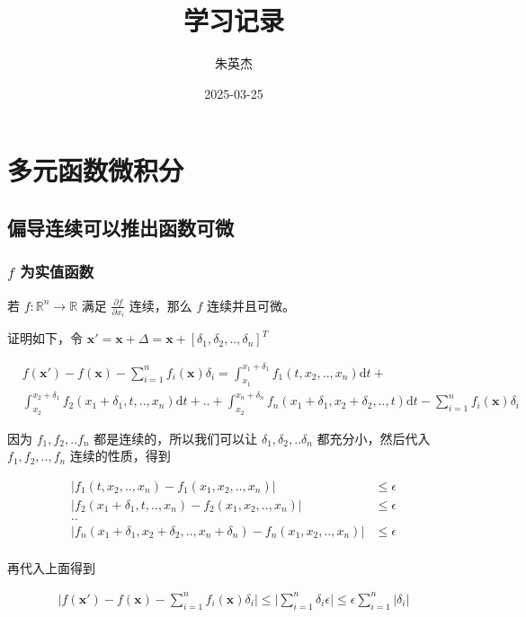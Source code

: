 \documentclass[12pt,a4paper]{ctexart}
\title{学习记录}
\author{朱英杰}
\date{2025-03-25}
\begin{document}
\maketitle
\tableofcontents

\section{多元函数微积分}

\subsection{偏导连续可以推出函数可微}

\subsubsection{$f$ 为实值函数}

若 $f: \mathbb{R}^n \to \mathbb{R}$ 满足 $\frac{\partial f}{\partial x_i}$ 连续，那么 $f$ 连续并且可微。

证明如下，令 $\mathbf{x'} = \mathbf{x} + \Delta = \mathbf{x} + [\delta_1, \delta_2, .., \delta_n]^T$

\begin{align*}
    & f(\mathbf{x}')  - f(\mathbf{x}) - \sum_{i=1}^{n}f_i(\mathbf{x})\delta_i = \int_{x_1}^{x_1 + \delta_1}f_1(t, x_2, .., x_n) \text{d}t  + \\ 
    & \int_{x_2}^{x_2 + \delta_1}f_2(x_1 + \delta_1, t, .., x_n) \text{d}t + .. + \int_{x_2}^{x_n + \delta_n}f_n(x_1 + \delta_1, x_2 + \delta_2, .., t) \text{d}t - \sum_{i=1}^{n}f_i(\mathbf{x}) \delta_i
\end{align*}

因为 $f_1, f_2, .. f_n$ 都是连续的，所以我们可以让 $\delta_1, \delta_2, .. \delta_n$ 都充分小，然后代入 $f_1, f_2, .., f_n$ 连续的性质，得到

\begin{align*}
\lvert f_1(t,x_2,..,x_n) - f_1(x_1, x_2, .. ,x_n)\rvert & \le \epsilon \\
\lvert f_2(x_1 + \delta_1,t,..,x_n) - f_2(x_1, x_2, .. ,x_n)\rvert & \le \epsilon \\
.. \\
\lvert f_n(x_1 + \delta_1,x_2+\delta_2,..,x_n+\delta_n) - f_n(x_1, x_2, .. ,x_n)\rvert & \le \epsilon \\
\end{align*}

再代入上面得到

\begin{align*}
    \lvert f(\mathbf{x}')  - f(\mathbf{x}) - \sum_{i=1}^{n}f_i(\mathbf{x})\delta_i \rvert \le \lvert \sum_{i=1}^{n} \delta_i \epsilon \rvert \le \epsilon \sum_{i=1}^{n} \lvert \delta_i \rvert
\end{align*}
\end{document}
